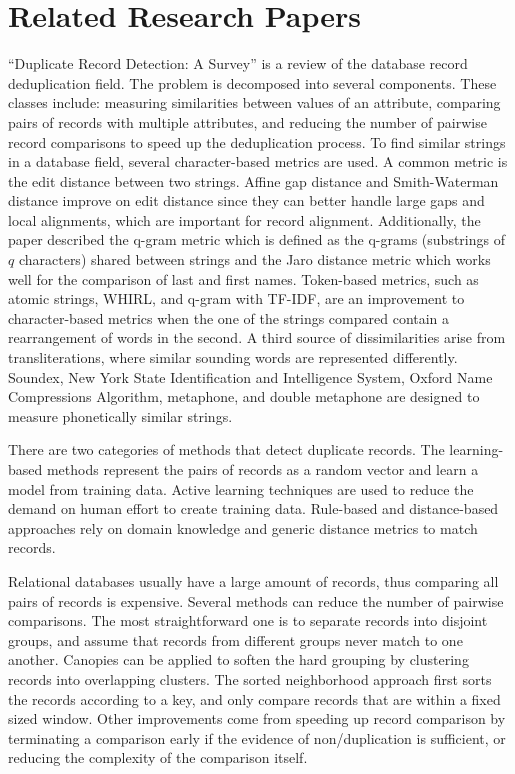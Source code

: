 \documentclass[]{article}
\begin{document}
\section{Related Research Papers} %
\label{sec:appropriate_papers}
``Duplicate Record Detection: A Survey'' \cite{Elmagarmid2007} is a review of the database record deduplication field.  The problem is decomposed into several components. These classes include: measuring similarities between values of an attribute, comparing pairs of records with multiple attributes, and reducing the number of pairwise record comparisons to speed up the deduplication process.  To find similar strings in a database field, several character-based metrics are used.  A common metric is the edit distance between two strings.  Affine gap distance and Smith-Waterman distance improve on edit distance since they can better handle large gaps and local alignments, which are important for record alignment.  Additionally, the paper described the q-gram metric which is defined as the q-grams (substrings of $q$ characters) shared between strings and the Jaro distance metric which works well for the comparison of last and first names.  Token-based metrics, such as atomic strings, WHIRL, and q-gram with TF-IDF, are an improvement to character-based metrics when the one of the strings compared contain a rearrangement of words in the second.  A third source of dissimilarities arise from transliterations, where similar sounding words are represented differently.  Soundex, New York State Identification and Intelligence System, Oxford Name Compressions Algorithm, metaphone, and double metaphone are designed to measure phonetically similar strings.  

There are two categories of methods that detect duplicate records.
The learning-based methods represent the pairs of records as a random vector and learn a model from training data.
Active learning techniques are used to reduce the demand on human effort to create training data.  Rule-based and distance-based approaches rely on domain knowledge and generic distance metrics to match records.

Relational databases usually have a large amount of records, thus comparing all pairs of records is expensive.  Several methods can reduce the number of pairwise comparisons.  The most straightforward one is to separate records into disjoint groups, and assume that records from different groups never match to one another.  Canopies can be applied to soften the hard grouping by clustering records into overlapping clusters.  The sorted neighborhood approach first sorts the records according to a key, and only compare records that are within a fixed sized window.  Other improvements come from speeding up record comparison by terminating a comparison early if the evidence of non/duplication is sufficient, or reducing the complexity of the comparison itself.
\end{document}
